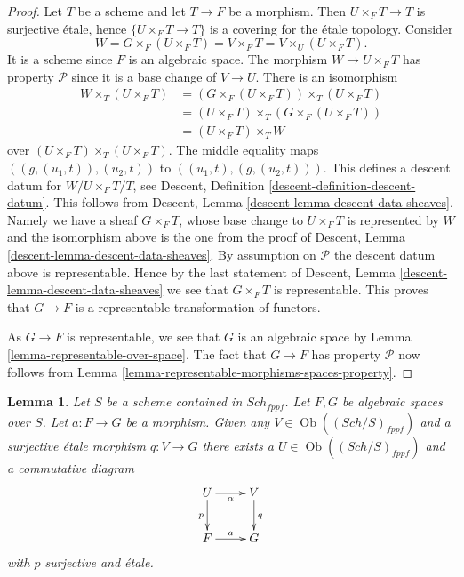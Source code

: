 \documentclass{stacks-project}
\theoremstyle{plain}
\newtheorem{lemma}[subsection]{Lemma}
\theoremstyle{definition}
\theoremstyle{remark}
\numberwithin{equation}{subsection}
\def\Sch{\mathit{Sch}}
\def\Ob{\mathop{\mathrm{Ob}}\nolimits}
\begin{document}
\begin{proof}
Let $T$ be a scheme and let $T \to F$ be a morphism. Then
$U \times_F T \to T$ is surjective \'etale, hence $\{U \times_F T \to T\}$ is
a covering for the \'etale topology. Consider
$$
W = G \times_F (U \times_F T) = V \times_F T = V \times_U (U \times_F T).
$$
It is a scheme since $F$ is an algebraic space. The morphism
$W \to U \times_F T$ has property $\mathcal{P}$ since it is a
base change of $V \to U$. There is an isomorphism
\begin{align*}
W \times_T (U \times_F T) & =
(G \times_F (U \times_F T)) \times_T (U \times_F T) \\
& = (U \times_F T) \times_T (G \times_F (U \times_F T)) \\
& = (U \times_F T) \times_T W
\end{align*}
over $(U \times_F T) \times_T (U \times_F T)$. The middle equality maps
$((g, (u_1, t)), (u_2, t))$ to $((u_1, t), (g, (u_2, t)))$.
This defines a descent datum for $W/U \times_F T/T$, see
Descent, Definition \ref{descent-definition-descent-datum}.
This follows from
Descent, Lemma \ref{descent-lemma-descent-data-sheaves}.
Namely we have a sheaf $G \times_F T$, whose
base change to $U \times_F T$ is represented by $W$ and the isomorphism
above is the one from the proof of
Descent, Lemma \ref{descent-lemma-descent-data-sheaves}.
By assumption on $\mathcal{P}$ the descent datum above is representable.
Hence by the last statement of
Descent, Lemma \ref{descent-lemma-descent-data-sheaves}
we see that $G \times_F T$ is representable. This proves that
$G \to F$ is a representable transformation of functors.

\medskip\noindent
As $G \to F$ is representable, we see that $G$ is an algebraic space by
Lemma \ref{lemma-representable-over-space}. The fact that $G \to F$ has
property $\mathcal{P}$ now follows from
Lemma \ref{lemma-representable-morphisms-spaces-property}.
\end{proof}

\begin{lemma}
\label{lemma-lift-morphism-presentations}
Let $S$ be a scheme contained in $\Sch_{fppf}$.
Let $F, G$ be algebraic spaces over $S$.
Let $a : F \to G$ be a morphism.
Given any $V \in \Ob((\Sch/S)_{fppf})$
and a surjective \'etale morphism $q : V \to G$ there exists
a $U \in \Ob((\Sch/S)_{fppf})$
and a commutative diagram
$$
\xymatrix{
U \ar[d]_p \ar[r]_\alpha &
V \ar[d]^q \\
F \ar[r]^a & G
}
$$
with $p$ surjective and \'etale.
\end{lemma}
\end{document}
